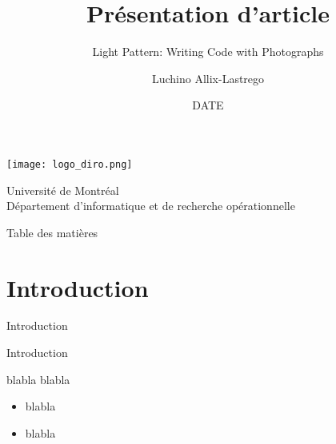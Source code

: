 \documentclass[xcolor={dvipsnames,svgnames}]{beamer}
\title{Présentation d'article}
\subtitle{Light Pattern: Writing Code with Photographs}
\author{Luchino Allix-Lastrego}
\institute{6251 - Art algorithmique}
\date{DATE}
\begin{document}
\begin{frame}
	\titlepage
	\begin{center}
		\texttt{[image: logo\_diro.png]}

		\vspace{0.3cm}

		Université de Montréal\\
		Département d'informatique et de recherche opérationnelle\\

	\end{center}
\end{frame}

\begin{frame}{Table des matières}
	\tableofcontents
\end{frame}

\section{Introduction}
\begin{frame}
	\centering
	\Large Introduction
\end{frame}

\begin{frame}{Introduction}
	\begin{block}{blabla}
		blabla
	\end{block}

	\hfill

	
	\begin{itemize}
		\item blabla
		\item blabla
	\end{itemize}
\end{frame}
\end{document}
